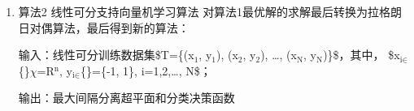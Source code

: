 \documentclass[11pt]{ctexart}
\begin{document}
\begin{enumerate}
\begin{enumerate}
\begin{enumerate}
\item 构造并求解最优化问题：
\lstset{language=[LaTeX]TeX,label= ,caption= ,captionpos=b,numbers=none}
\begin{lstlisting}
\begin{subequations}
  \begin{align}
    min_{\omega,b}&\frac{1}{2}||\omega||^2\\\nonumber
    s.t. & y_i(\omega\cdot{}x_i+b)-1\geq{}0, i = 1,2,\ldots,N
  \end{align}
\end{subequations}
\end{lstlisting}
求得最优解 \(\omega^{\ast}\) 和 \(b^{\ast}\)
\item 由此得到分离超平面
\lstset{language=[LaTeX]TeX,label= ,caption= ,captionpos=b,numbers=none}
\begin{lstlisting}
\begin{equation}
  \omega^{\ast}\cdot{}x+b^{\ast} = 0
\end{equation}
\end{lstlisting}
和分类决策函数
\lstset{language=[LaTeX]TeX,label= ,caption= ,captionpos=b,numbers=none}
\begin{lstlisting}
\begin{equation}
  f(x) = sign(\omega^{\ast}\cdot{}x+b^{\ast})
\end{equation}
\end{lstlisting}
\end{enumerate}
\item 算法2 线性可分支持向量机学习算法
\label{sec:orgheadline74}
对算法1最优解的求解最后转换为拉格朗日对偶算法，最后得到新的算法：

输入：线性可分训练数据集\$T=\{(x\(_{\text{1}}\), y\(_{\text{1}}\)), (x\(_{\text{2}}\), y\(_{\text{2}}\)), \ldots, (x\(_{\text{N}}\), y\(_{\text{N}}\))\}\$，其中，
\$x\(_{\text{i}\in}\)\{\}\(\chi\)=R\(^{\text{n}}\), y\(_{\text{i}\in}\)\{\}=\{-1, 1\}, i=1,2,\ldots, N\$；

输出：最大间隔分离超平面和分类决策函数


\end{enumerate}
\end{enumerate}
\end{document}
